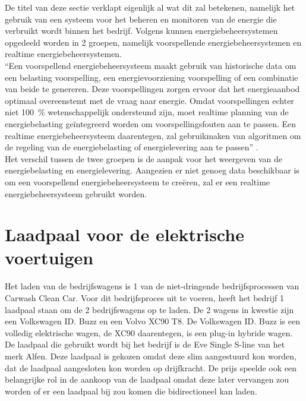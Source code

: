 De titel van deze sectie verklapt eigenlijk al wat dit zal betekenen, namelijk het gebruik van een systeem voor het beheren en monitoren van de energie die verbruikt wordt binnen het bedrijf. Volgens \textcite{FALOPE2024} kunnen energiebeheersystemen opgedeeld worden in 2 groepen, namelijk voorspellende energiebeheersystemen en realtime energiebeheersystemen.\\

“Een voorspellend energiebeheersysteem maakt gebruik van historische data om een belasting voorspelling, een energievoorziening voorspelling of een combinatie van beide te genereren. Deze voorspellingen zorgen ervoor dat het energieaanbod optimaal overeenstemt met de vraag naar energie. Omdat voorspellingen echter niet 100~\% wetenschappelijk ondersteund zijn, moet realtime planning van de energiebelasting geïntegreerd worden om voorspellingsfouten aan te passen. Een realtime energiebeheersysteem daarentegen, zal gebruikmaken van algoritmen om de regeling van de energiebelasting of energielevering aan te passen” \autocite{FALOPE2024}.\\

Het verschil tussen de twee groepen is de aanpak voor het weergeven van de energiebelasting en energielevering. Aangezien er niet genoeg data beschikbaar is om een voorspellend energiebeheersysteem te creëren, zal er een realtime energiebeheersysteem gebruikt worden.

\section{Laadpaal voor de elektrische voertuigen}
\label{sec:stand-van-zaken-laadpaal}

Het laden van de bedrijfswagens is 1 van de niet-dringende bedrijfsprocessen van Carwash Clean Car. Voor dit bedrijfsproces uit te voeren, heeft het bedrijf 1 laadpaal staan om de 2 bedrijfswagens op te laden. De 2 wagens in kwestie zijn een Volkswagen ID. Buzz en een Volvo XC90 T8. De Volkswagen ID. Buzz is een volledig elektrische wagen, de XC90 daarentegen, is een plug-in hybride wagen. De laadpaal die gebruikt wordt bij het bedrijf is de Eve Single S-line van het merk Alfen. Deze laadpaal is gekozen omdat deze slim aangestuurd kon worden, dat de laadpaal aangesloten kon worden op drijfkracht. De prijs speelde ook een belangrijke rol in de aankoop van de laadpaal omdat deze later vervangen zou worden of er een laadpaal bij zou komen die bidirectioneel kan laden.

